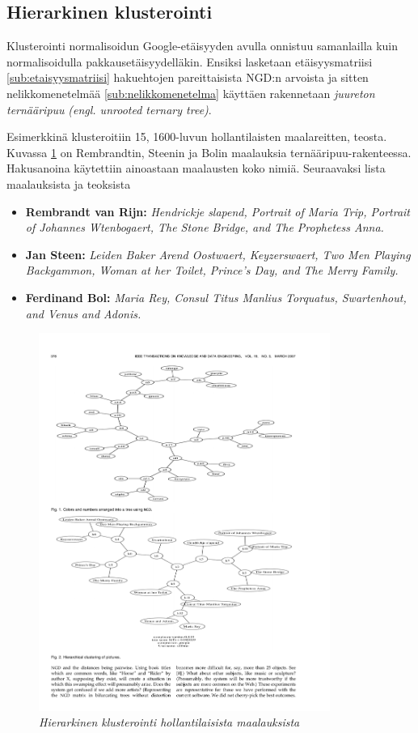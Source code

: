 \documentclass[12pt,finnish]{tktltiki2}
\theoremstyle{definition}
\theoremstyle{remark}
\newcommand{\engl}[1]{\emph{(engl. #1)}}
\begin{document}
    \subsection{Hierarkinen klusterointi} %
    \label{sub:klusterointi}
      Klusterointi normalisoidun Google-etäisyyden avulla onnistuu samanlailla kuin normalisoidulla pakkausetäisyydelläkin. Ensiksi lasketaan etäisyysmatriisi \ref{sub:etaisyysmatriisi} hakuehtojen pareittaisista NGD:n arvoista ja sitten nelikkomenetelmää \ref{sub:nelikkomenetelma} käyttäen rakennetaan \emph{juureton ternääripuu} \engl{unrooted ternary tree}.

      Esimerkkinä klusteroitiin 15, 1600-luvun hollantilaisten maalareitten, teosta.
      Kuvassa \ref{fig:dutch-paintings} on Rembrandtin, Steenin ja Bolin maalauksia ternääripuu-rakenteessa.
      Hakusanoina käytettiin ainoastaan maalausten koko nimiä. Seuraavaksi lista maalauksista ja teoksista

      \begin{itemize}
        \item \textbf{Rembrandt van Rijn:} \emph{Hendrickje slapend, Portrait of Maria Trip, Portrait of Johannes Wtenbogaert, The Stone Bridge, and The Prophetess Anna.}
        \item \textbf{Jan Steen:} \emph{Leiden Baker Arend Oostwaert, Keyzerswaert, Two Men Playing Backgammon, Woman at her Toilet, Prince’s Day, and The Merry Family.}
        \item \textbf{Ferdinand Bol:} \emph{Maria Rey, Consul Titus Manlius Torquatus, Swartenhout, and Venus and Adonis.}
      \end{itemize}

      \begin{figure}[tb]
        \immediate{}
        \includegraphics[width=\textwidth, height=350pt]{img/dutch-paintings}
        \caption{\emph{Hierarkinen klusterointi hollantilaisista maalauksista} \cite{cilibrasi2007google} }
        \label{fig:dutch-paintings}
      \end{figure}
\end{document}

